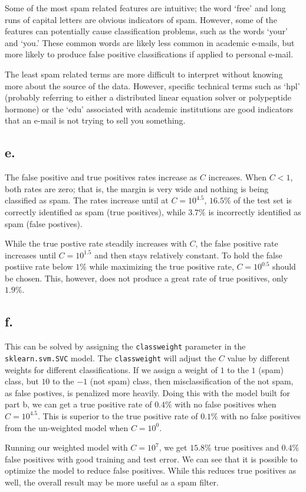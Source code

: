 \documentclass{article}
\begin{document}
Some of the most spam related features are intuitive; the word `free' and long runs of capital letters are obvious indicators of spam. However, some of the features can potentially cause classification problems, such as the words `your' and `you.' These common words are likely less common in academic e-mails, but more likely to produce false positive classifications if applied to personal e-mail. 

The least spam related terms are more difficult to interpret without knowing more about the source of the data. However, specific technical terms such as `hpl' (probably referring to either a distributed linear equation solver or polypeptide hormone) or the `edu' associated with academic institutions are good indicators that an e-mail is not trying to sell you something. 

\subsection*{e.}
The false positive and true positives rates increase as $C$ increases. When $C<1$, both rates are zero; that is, the margin is very wide and nothing is being classified as spam. The rates increase until at $C = 10^{4.5}$, $16.5\%$ of the test set is correctly identified as spam (true positives), while $3.7\%$ is incorrectly identified as spam (false postives). 

While the true postive rate steadily increases with $C$, the false positive rate increases until $C=10^{1.5}$ and then stays relatively constant. To hold the false postiive rate below $1\%$ while maximizing the true positive rate, $C=10^{0.5}$ should be chosen. This, however, does not produce a great rate of true positives, only $1.9\%$. 

\subsection*{f.}

This can be solved by assigning the \texttt{class\textunderscore weight} parameter in the \texttt{sklearn.svm.SVC} model. The \texttt{class\textunderscore weight} will adjust the $C$ value by different weights for different classifications. If we assign a weight of $1$ to the $1$ (spam) class, but $10$ to the $-1$ (not spam) class, then misclassification of the not spam, as false postives, is penalized more heavily. Doing this with the model built for part b, we can get a true positive rate of $0.4\%$ with no false positives when $C=10^{4.5}$. This is superior to the true positive rate of $0.1\%$ with no false positives from the un-weighted model when $C=10^0$. 

Running our weighted model with $C=10^{7}$, we get $15.8\%$ true positives and $0.4\%$ false positives with good training and test error. We can see that it is possible to optimize the model to reduce false positives. While this reduces true positives as well, the overall result may be more useful as a spam filter. 
\end{document}
